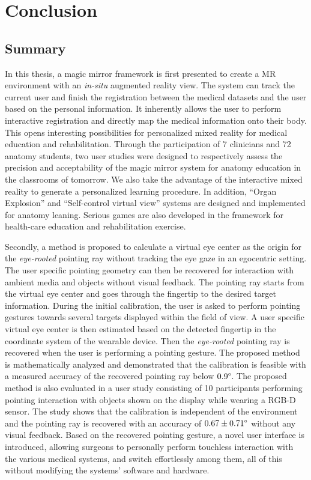 \chapter{Conclusion} \label{chaptor:ConDis}
\section{Summary}
In this thesis, a magic mirror framework is first presented to create a MR environment with an \textit{in-situ} augmented reality view. The system can track the current user and finish the registration between the medical datasets and the user based on the personal information. It inherently allows the user to perform interactive registration and directly map the medical information onto their body. This opens interesting possibilities for personalized mixed reality for medical education and rehabilitation. 
Through the participation of 7 clinicians and 72 anatomy students, two user studies were designed to respectively assess the precision and acceptability of the magic mirror system for anatomy education in the classrooms of tomorrow. 
We also take the advantage of the interactive mixed reality to generate a personalized learning procedure. In addition, ``Organ Explosion'' and ``Self-control virtual view'' systems are designed and implemented for anatomy leaning. Serious games are also developed in the framework for health-care education and rehabilitation exercise.

Secondly, a method is proposed to calculate a virtual eye center as the origin for the \textit{eye-rooted} pointing ray without tracking the eye gaze in an egocentric setting. The user specific pointing geometry can then be recovered for interaction with ambient media and objects without visual feedback. 
The pointing ray starts from the virtual eye center and goes through the fingertip to the desired target information. 
During the initial calibration, the user is asked to perform pointing gestures towards several targets displayed within the field of view. A user specific virtual eye center is then estimated based on the detected fingertip in the coordinate system of the wearable device. Then the \textit{eye-rooted} pointing ray is recovered when the user is performing a pointing gesture. 
The proposed method is mathematically analyzed and demonstrated that the calibration is feasible with a measured accuracy of the recovered pointing ray below $0.9\degree$. The proposed method is also evaluated in a user study consisting of 10 participants performing pointing interaction with objects shown on the display while wearing a RGB-D sensor. The study shows that the calibration is independent of the environment and the pointing ray is recovered with an accuracy of $0.67 \pm 0.71\degree$ without any visual feedback. 
Based on the recovered pointing gesture, a novel user interface is introduced, allowing surgeons to {personally} perform touchless interaction with the {various} medical systems, and switch effortlessly among them, all of this without modifying the systems' software and hardware.

